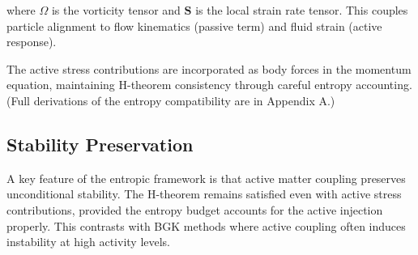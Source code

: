 where $\Omega$ is the vorticity tensor and $\mathbf{S}$ is the local strain rate tensor. This couples particle alignment to flow kinematics (passive term) and fluid strain (active response).

The active stress contributions are incorporated as body forces in the momentum equation, maintaining H-theorem consistency through careful entropy accounting. (Full derivations of the entropy compatibility are in Appendix A.)

\subsection{Stability Preservation}

A key feature of the entropic framework is that active matter coupling preserves unconditional stability. The H-theorem remains satisfied even with active stress contributions, provided the entropy budget accounts for the active injection properly. This contrasts with BGK methods where active coupling often induces instability at high activity levels.
